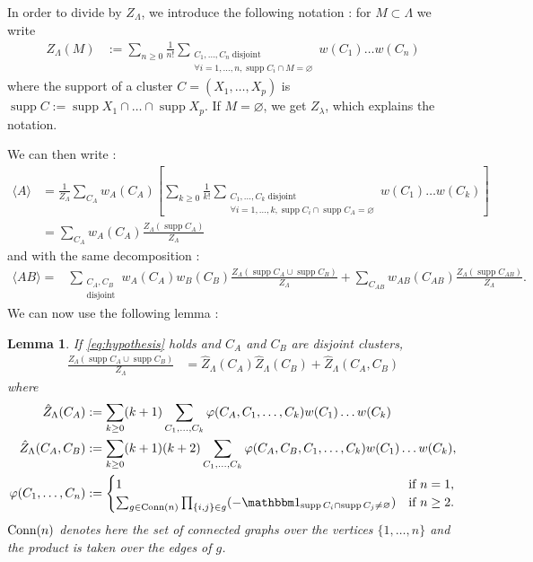 \documentclass{article}
\newtheorem{lem}[thm]{Lemma}
\DeclareMathOperator{\disj}{disjoint}
\DeclareMathOperator{\supp}{supp}
\begin{document}
    In order to divide by $Z_\Lambda$, we introduce the following notation : for $M\subset \Lambda$ we write
    \begin{align*}
        Z_\Lambda(M)&:=\sum_{n\geq0}\frac 1{n!} \sum_{\substack{
            C_1,\ldots,C_n \disj\\
            \forall i=1,\ldots,n, \supp C_i\cap M =\varnothing
            }}w(C_1)\ldots w(C_n)
    \end{align*}
    where the support of a cluster $C=(X_1,\ldots,X_p)$ is $\supp C:=\supp X_1\cap\ldots\cap\supp X_p$.
    If $M=\varnothing$, we get $Z_\lambda$, which explains the notation.
    
    We can then write :
    \begin{align*}
        \langle A\rangle &= \frac 1 {Z_\Lambda}\sum_{C_A}w_A(C_A)\left[\sum_{k\geq 0} \frac 1{k!}\sum_{\substack{C_1,\ldots,C_k\disj\\\forall i=1,\ldots,k, \supp C_i\cap \supp C_A=\varnothing}}w(C_1)\ldots w(C_k)\right]\\
        &=\sum_{C_A}w_A(C_A)\frac{Z_\Lambda(\supp C_A)}{Z_\Lambda}
    \end{align*}
    and with the same decomposition :
    \begin{align*}
        \langle AB\rangle=& \sum_{\substack{C_{A},C_B\\\disj}}w_A(C_A)w_B(C_B)\frac{Z_\Lambda(\supp C_A \cup \supp C_B)}{Z_\Lambda}+\sum_{C_{AB}}w_{AB}(C_{AB})\frac{Z_\Lambda(\supp C_{AB})}{Z_\Lambda}.
    \end{align*}
    We can now use the following lemma :
    \begin{lem}
        \label{lem:Z/Z}
        If \cref{eq:hypothesis} holds and $C_A$ and $C_B$ are disjoint clusters,
        \begin{align*}
            \frac{Z_\Lambda(\supp C_A\cup \supp C_B)}{Z_\Lambda}&=\hat Z_\Lambda(C_A)\hat Z_\Lambda(C_B)+\hat Z_\Lambda(C_A,C_B)
        \end{align*}
        where \begin{align*}
            \hat Z_\Lambda(C_A)&:=\sum_{k\geq 0}(k+1)\sum_{C_1,\ldots,C_k}\varphi(C_A,C_1,\ldots,C_k)w(C_1)\ldots w(C_k)\\
            \hat Z_\Lambda(C_A,C_B)&:=\sum_{k\geq 0}(k+1)(k+2)\sum_{C_1,\ldots,C_k}\varphi(C_A,C_B,C_1,\ldots,C_k)w(C_1)\ldots w(C_k),\\
            \varphi(C_1,\ldots,C_n)&:=\begin{cases}
                1&\textnormal{if $n=1$,}\\
                \sum_{g\in \textnormal{Conn}(n)}\prod_{\{i,j\}\in g}(-\mathbbm 1_{\supp C_i\cap \supp C_j\neq \varnothing})&\textnormal{if $n\geq 2$.}
            \end{cases}
        \end{align*}
        $\textnormal{Conn}(n)$ denotes here the set of connected graphs over the vertices $\{1,\ldots,n\}$ and the product is taken over the edges of $g$.
    \end{lem}
\end{document}
